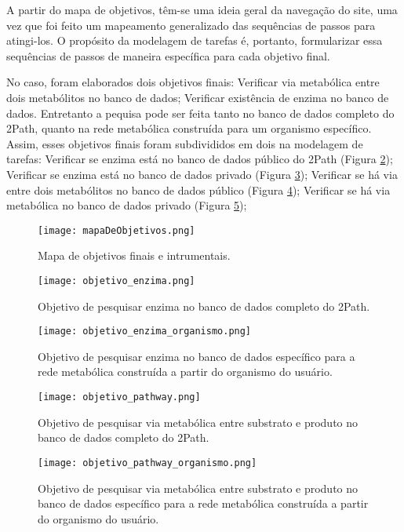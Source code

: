 \indent A partir do mapa de objetivos, têm-se uma ideia geral da navegação do site, uma vez que foi feito um mapeamento generalizado das sequências de passos para atingi-los. O propósito da modelagem de tarefas é, portanto, formularizar essa sequências de passos de maneira específica para cada objetivo final. 

\indent No caso, foram elaborados dois objetivos finais: Verificar via metabólica entre dois metabólitos no banco de dados; Verificar existência de enzima no banco de dados. Entretanto a pequisa pode ser feita tanto no banco de dados completo do 2Path, quanto na rede metabólica construída para um organismo específico. Assim, esses objetivos finais foram subdivididos em dois na modelagem de tarefas: Verificar se enzima está no banco de dados público do 2Path (Figura \ref{fig:objetivo_enzyma}); Verificar se enzima está no banco de dados privado (Figura \ref{fig:objetivo_enzyma_organismo}); Verificar se há via entre dois metabólitos no banco de dados público (Figura \ref{fig:objetivo_pathway}); Verificar se há via metabólica no banco de dados privado (Figura \ref{fig:objetivo_pathway_organismo});

\newpage 
\begin{figure}[!h] %
    \centering
    \texttt{[image: mapaDeObjetivos.png]}
    \caption{Mapa de objetivos finais e intrumentais.}
    \label{fig:mapaDeObjetivos}
\end{figure} 
\begin{figure}[!h]
    \centering
    \texttt{[image: objetivo\_enzima.png]}
    \caption{Objetivo de pesquisar enzima no banco de dados completo do 2Path.}
    \label{fig:objetivo_enzyma}
\end{figure}
\break

\begin{figure}[!h]
    \centering
    \texttt{[image: objetivo\_enzima\_organismo.png]}
    \caption{Objetivo de pesquisar enzima no banco de dados específico para a rede metabólica construída a partir do organismo do usuário.}
    \label{fig:objetivo_enzyma_organismo}
\end{figure}

\begin{figure}[!h]
    \centering
    \texttt{[image: objetivo\_pathway.png]}
    \caption{Objetivo de pesquisar via metabólica entre substrato e produto no banco de dados completo do 2Path.}
    \label{fig:objetivo_pathway}
\end{figure}
\break
\begin{figure}[!h]
    \centering
    \texttt{[image: objetivo\_pathway\_organismo.png]}
    \caption{Objetivo de pesquisar via metabólica entre substrato e produto no banco de dados  específico para a rede metabólica construída a partir do organismo do usuário.}
    \label{fig:objetivo_pathway_organismo}
\end{figure}

